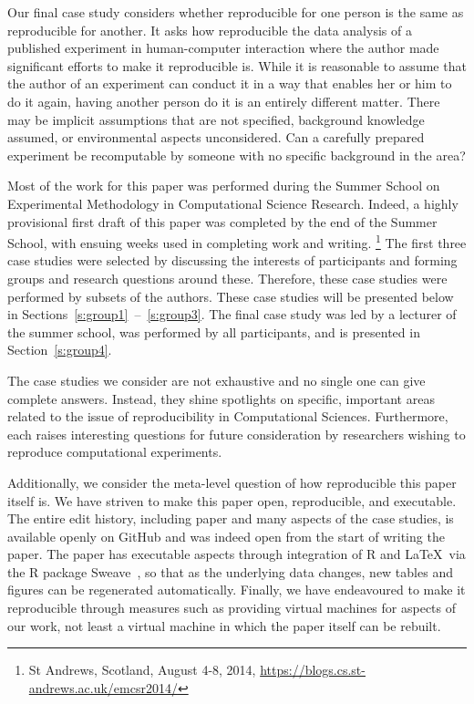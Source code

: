 Our final case study considers whether reproducible for one person is the same
as reproducible for another. It asks how reproducible the data analysis of a
published experiment in human-computer interaction where the author made
significant efforts to make it reproducible is. While it is reasonable to assume
that the author of an experiment can conduct it in a way that enables her or him
to do it again, having another person do it is an entirely different matter.
There may be implicit assumptions that are not specified, background knowledge
assumed, or environmental aspects unconsidered. Can a carefully prepared
experiment be recomputable by someone with no specific background in the area?

Most of the work for this paper was performed during the Summer School on
Experimental Methodology in Computational Science Research. Indeed, a highly
provisional first draft of this paper was completed by the end of the Summer
School, with ensuing weeks used in completing work and writing.  \footnote{St
Andrews, Scotland, August 4-8, 2014,
\url{https://blogs.cs.st-andrews.ac.uk/emcsr2014/}} The first three case studies
were selected by discussing the interests of participants and forming groups
and research questions around these. Therefore, these case studies were
performed by subsets of the authors. These case studies will be
presented below in Sections~\ref{s:group1}~--~\ref{s:group3}. The final case
study was led by a lecturer of the summer school, was performed by all
participants, and is presented in Section~\ref{s:group4}.

The case studies we consider are not exhaustive and no single one can give
complete answers. Instead, they shine spotlights on specific, important areas
related to the issue of reproducibility in Computational Sciences. Furthermore,
each raises interesting questions for future consideration by researchers
wishing to reproduce computational experiments.

Additionally, we consider the meta-level question of how reproducible this paper
itself is.  We have striven to make this paper open, reproducible, and
executable.
The entire edit history, including paper and many aspects of the
case studies, is available openly on GitHub and was indeed open from the start
of writing the paper.  The paper has executable aspects through integration of R
and \LaTeX\ via the R package Sweave~\cite{sweave}, so that as the underlying
data changes, new tables and figures can be regenerated automatically. Finally,
we have endeavoured to make it reproducible through measures such as providing
virtual machines for aspects of our work, not least a virtual machine in which
the paper itself can be rebuilt.
